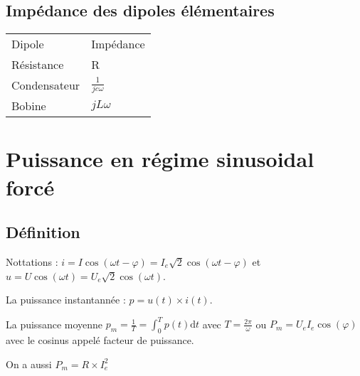 \documentclass[french]{yLectureNote}
\newcommand{\dd}{\mathrm{d}}
\begin{document}
\subsection{Impédance des dipoles élémentaires}
\begin{center}
\begin{tabular}{ll}
Dipole & Impédance\\
Résistance & R\\
Condensateur & \(\frac{1}{jc\omega}\)\\
Bobine & \(jL\omega\)
\end{tabular}
\end{center}

\section{Puissance en régime sinusoidal forcé}
\subsection{Définition}
Nottations : \(i = I\cos(\omega t-\varphi) = I_e \sqrt{2} \cos(\omega t-\varphi)\) et \(u = U\cos(\omega t) = U_e \sqrt{2} \cos(\omega t)\).
\begin{definition}[Puissance]
La puissance instantannée : \(p = u(t)\times i(t)\).

La puissance moyenne \(p_m = \frac{1}{T} = \int^{T}_{0}p(t)\dd t\) avec \(T = \frac{2\pi}{\omega}\) ou \(P_m = U_eI_e \cos(\varphi)\) avec le cosinus appelé facteur de puissance.

On a aussi \(P_m = R\times I_e^2\)
\end{definition}
\end{document}
